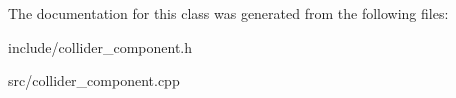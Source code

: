 The documentation for this class was generated from the following files\+:\begin{DoxyCompactItemize}
\item 
include/collider\+\_\+component.\+h\item 
src/collider\+\_\+component.\+cpp\end{DoxyCompactItemize}
